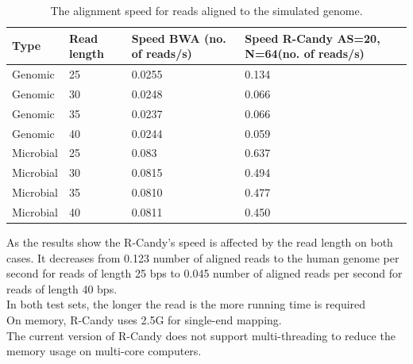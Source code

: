 \documentclass[11pt,a4paper]{report}
\begin{document}
\begin{table}[h]
  \begin{tabular}{ |  p{2cm} | p{2cm} | p{3cm} | p{3cm} | }
    \hline
  	\textbf{Type} & \textbf{Read length }&\textbf{Speed BWA \hspace{35pt}(no. of reads/s) } 	 
  	& \textbf{Speed R-Candy AS=20, N=64\hspace{35pt}(no. of reads/s)}\\ \hline
  
      Genomic   & 25  & 0.0255  &  0.134 \\ \hline 
      Genomic   & 30  & 0.0248  &  0.066 \\ \hline 
 	  Genomic	& 35  & 0.0237  &  0.066 \\ \hline 
 	  Genomic	& 40  & 0.0244  &  0.059 \\ \hline 
 	  Microbial & 25  & 0.083   &  0.637 \\ \hline 
      Microbial & 30  & 0.0815  &  0.494 \\ \hline 
 	  Microbial & 35  & 0.0810  &  0.477 \\ \hline 
 	  Microbial & 40  & 0.0811  &  0.450 \\ \hline 
 	  
   \end{tabular}
\caption{The alignment speed for reads aligned to the simulated genome.}
\label{speed-SG}
\end{table}



As the results  show  the R-Candy's speed is affected by the read length on both cases.
It decreases from 0.123 number of aligned reads to the human genome per second for reads 
of length 25 bps to 0.045 number of aligned reads per second for reads of length 40 bps. \\
In both test sets, the longer the read is the more running time is required\\

On memory, R-Candy uses 2.5G for single-end mapping.\\

The current version of R-Candy does not support multi-threading to reduce the 
memory usage on multi-core computers.\\\\


\end{document}
